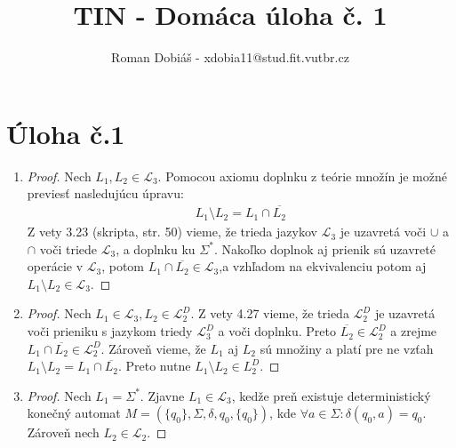 \documentclass[10pt]{article}
\begin{document}
 
 
 
\title{TIN - Domáca úloha č. 1}%
\author{Roman Dobiáš - xdobia11@stud.fit.vutbr.cz}
 
\maketitle

\section*{Úloha č.1}
\begin{enumerate}
\item 
    \begin{proof}
    Nech $L_1, L_2 \in \mathcal{L}_3$. 
    Pomocou axiomu doplnku z teórie množín je možné previesť nasledujúcu úpravu:
        \begin{align*}
            L_1 \setminus L_2 = L_1 \cap \overline{L_2}
        \end{align*}
    Z vety 3.23 (skripta, str. 50) vieme, že trieda jazykov $\mathcal{L}_3$ je uzavretá voči
    $\cup$ a $\cap$ voči triede $\mathcal{L}_3$, a doplnku ku $\Sigma^{*}$.
            Nakoľko doplnok aj prienik sú uzavreté operácie v $\mathcal{L}_3$, potom $L_1 \cap
    \overline{L_2} \in \mathcal{L}_3$,a vzhľadom na ekvivalenciu potom aj $L_1 \setminus L_2 \in
    \mathcal{L}_3$. 
    \end{proof}
\item 
    \begin{proof}
    Nech $L_1 \in \mathcal{L}_3, L_2 \in \mathcal{L}_2^D$. Z vety 4.27 vieme, že trieda
        $\mathcal{L}_2^D$ je uzavretá voči prieniku s jazykom triedy $\mathcal{L}_3^D$ a voči
        doplnku. 
        Preto $\overline{L_2} \in \mathcal{L}_2^D$ a zrejme $L_1 \cap \overline{L_2} \in
        \mathcal{L}_2^D$. Zároveň vieme, že $L_1$ aj $L_2$ sú množiny a platí pre ne vzťah $L_1
        \setminus L_2 = L_1\cap \overline{L_2}$. Preto nutne $L_1\setminus L_2 \in L_2^D$.
    \end{proof}

\item 
    \begin{proof}
    Nech $L_1 = \Sigma^*$. Zjavne $L_1 \in \mathcal{L}_3$, kedže preň existuje deterministický konečný automat $M =
        (\{q_0\},\Sigma, \delta, q_0, \{q_0\})$, kde $\forall a \in \Sigma : \delta(q_0, a) = q_0$.
    Zároveň nech $L_2 \in \mathcal{L}_2$.


\end{proof}
\end{enumerate}
\end{document}
